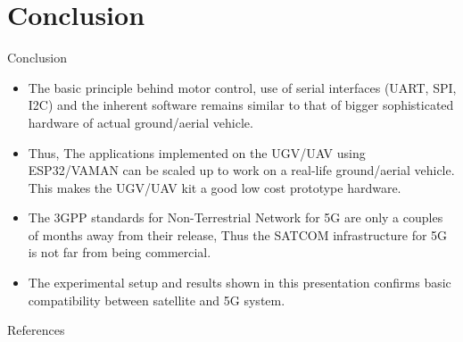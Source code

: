 \documentclass[xcolor=table]{beamer}
\begin{document}
\section{Conclusion}
\begin{frame}{Conclusion}
\begin{itemize}
 \item The basic principle behind motor control, use of serial interfaces (UART, SPI, I2C) and the inherent software remains similar to that of bigger sophisticated hardware of actual ground/aerial vehicle.
	\item Thus, The applications implemented on the UGV/UAV using ESP32/VAMAN can be scaled up to work on a real-life ground/aerial vehicle. This makes the UGV/UAV kit a good low cost prototype hardware.
	\item The 3GPP standards for Non-Terrestrial Network for 5G are only a couples of months away from their release, Thus the SATCOM infrastructure for 5G is not far from being commercial. 
	\item The experimental setup and results shown in this presentation confirms basic compatibility between satellite and 5G system.
	
\end{itemize}

\end{frame}

%
%



\begin{frame}[t,allowframebreaks]{References} 
	\nocite{*}
    \printbibliography
\end{frame}
\end{document}

